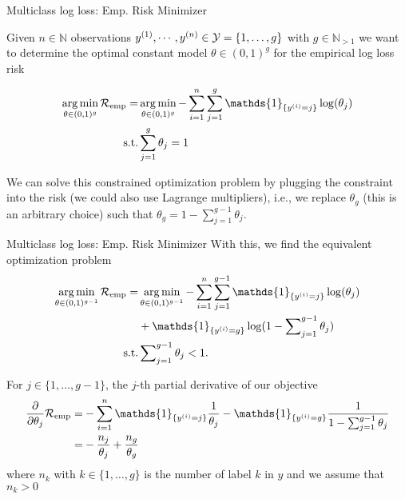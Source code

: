 \documentclass[11pt,compress,t,notes=noshow, xcolor=table]{beamer}
\newcommand{\argminl}{\mathop{\operatorname{arg\,min}}\limits}
\begin{document}
\begin{frame}{Multiclass log loss: Emp. Risk Minimizer}

Given $n \in \mathbb{N}$ observations $y^{(1)}, \cdots, y^{(n)} \in \mathcal{Y} = \{1, \dots, g\}$ with $g\in\mathbb{N}_{>1}$ we want to determine the optimal constant model $\theta \in (0,1)^g$ for the empirical log loss risk

\begin{align*}
\argminl_{\theta \in (0, 1)^g}\riske   =& 
\argminl_{\theta \in (0, 1)^g}-\sum^n_{i=1}\sum^g_{j=1} \mathds{1}_{\{y^{(i)} = j\}}\log(\theta_j) \\
\text{s.t.}& \sum^g_{j=1}\theta_j = 1
\end{align*}

We can solve this constrained optimization problem by plugging the constraint into the risk (we could also use Lagrange multipliers), i.e., we replace $\theta_g$ (this is an arbitrary choice) such that $
\theta_g = 1 - \sum^{g-1}_{j=1}\theta_j.$

\end{frame}
\begin{frame}{Multiclass log loss: Emp. Risk Minimizer}
With this, we find the equivalent optimization problem
\begin{align*}
\argminl_{\theta \in (0, 1)^{g-1}}\riske   = & \argminl_{\theta \in (0, 1)^{g-1}}
-\sum^n_{i=1}\sum^{g-1}_{j=1} \mathds{1}_{\{y^{(i)} = j\}}\log(\theta_j) \\ 
&+ \mathds{1}_{\{y^{(i)} = g\}}\log(1 - \sum\nolimits^{g-1}_{j=1}\theta_j) \\
\text{s.t.}&  \sum\nolimits^{g-1}_{j=1}\theta_j < 1.
\end{align*}

For $j \in \{1,\dots,g-1\}$, the $j$-th partial derivative of our objective 
\begin{align*}
\frac{\partial}{\partial \theta_j}\riske   = & 
-\sum^n_{i=1} \mathds{1}_{\{y^{(i)} = j\}}\frac{1}{\theta_j} - \mathds{1}_{\{y^{(i)} = g\}}\frac{1}{1 - \sum^{g-1}_{j=1}\theta_j} \\
= & -\frac{n_j}{\theta_j} + \frac{n_g}{\theta_g}
\end{align*}
where $n_k$ with $k\in \{1,\dots, g\}$ is the number of label $k$ in $y$ and we assume that $n_k > 0$

\end{frame}
\end{document}
